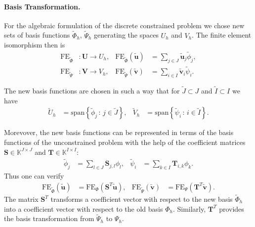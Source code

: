 \paragraph{Basis Transformation.} For the algebraic formulation of the
discrete constrained problem we chose new sets of basis functions
$\tilde{\Phi}_h$, $\tilde{\Psi}_h$ generating the spaces $U_h$ and
$V_h$. The finite element isomorphism then is
\begin{align*}
\text{FE}_{\tilde\Phi} &: \mathbf{U} \to U_h, &
 \text{FE}_{\tilde\Phi}(\tilde{\mathbf{u}}) &= \sum\limits_{j\in J}
 \tilde{\mathbf{u}}_j \tilde\phi_j,\\ 
\text{FE}_{\tilde\Psi} &: \mathbf{V} \to V_h, &
 \text{FE}_{\tilde\Psi}(\tilde{\mathbf{v}}) &= \sum\limits_{i\in I}
 \tilde{\mathbf{v}}_i \tilde\psi_i. 
\end{align*}

The new basis functions are chosen in such a way that for
$\tilde{J}\subset J$ and $\tilde{I}\subset I$ we have
\begin{align*}
\tilde{U}_h &= \text{span} \left\{\tilde\phi_j \,:\, j\in\tilde{J}\right\},  &
\tilde{V}_h &= \text{span} \left\{\tilde\psi_i \,:\, i\in\tilde{I}\right\}.
\end{align*}

Morevover, the new basis functions can be represented in terms of the
basis functions of the unconstrained problem with the help of the coefficient matrices
$\mathbf{S}\in\mathbb{K}^{J\times J}$ and
$\mathbf{T}\in\mathbb{K}^{I\times I}$:
\begin{align*}
\tilde\phi_j &= \sum_{l\in J} \mathbf{S}_{j,l} \phi_l, &
\tilde\psi_i &= \sum_{k\in I} \mathbf{T}_{i,k} \phi_k.
\end{align*}
Thus one can verify 
\begin{align*}
\text{FE}_{\tilde\Phi}(\tilde{\mathbf{u}}) &=
\text{FE}_{\Phi}(\mathbf{S}^T\tilde{\mathbf{u}}), &
\text{FE}_{\tilde\Psi}(\tilde{\mathbf{v}}) &=
\text{FE}_{\Psi}(\mathbf{T}^T\tilde{\mathbf{v}}).
\end{align*}
The matrix $\mathbf{S}^T$ transforms a coefficient vector with respect
to the new basis $\tilde\Phi_h$ into a coefficient vector with respect
to the old basis $\Phi_h$. Similarly, $\mathbf{T}^T$ provides the
basis transformation from $\tilde\Psi_h$ to $\Psi_h$.

